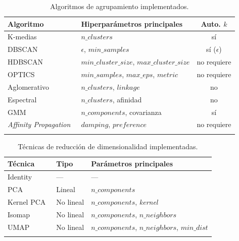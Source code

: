 \begin{longtable}{|l|l|c|} \hline
  \textbf{Algoritmo} & \textbf{Hiperparámetros principales} & \textbf{Auto. $k$} \\ \hline
  K-medias~\cite{arthur_k-means_2007} & $n\_clusters$ & sí \\ \hline
  DBSCAN~\cite{ester_density-based_1996} & $\epsilon$, $min\_samples$ & sí ($\epsilon$) \\ \hline
  HDBSCAN~\cite{campello_density-based_2013} & $min\_cluster\_size$, $max\_cluster\_size$ & no requiere \\ \hline
  OPTICS~\cite{ankerst_optics_1999} & $min\_samples$, $max\_eps$, $metric$ & no requiere \\ \hline
  Aglomerativo~\cite{mullner_modern_2011} & $n\_clusters$, $linkage$ & no \\ \hline
  Espectral~\cite{ng_spectral_2001,huang_ultra-scalable_2020} & $n\_clusters$, afinidad & no \\ \hline
  GMM~\cite{dempster_maximum_1977} & $n\_components$, covarianza & sí \\ \hline
  \textit{Affinity Propagation}~\cite{frey_clustering_2007} & $damping$, $preference$ & no requiere \\ \hline
  \caption{Algoritmos de agrupamiento implementados.}
  \label{tab:clustering-algos}
\end{longtable}

\begin{longtable}{|l|l|l|} \hline
  \textbf{Técnica} & \textbf{Tipo} & \textbf{Parámetros principales} \\ \hline
  Identity & --- & --- \\ \hline
  PCA~\cite{jolliffe_principal_2002} & Lineal & $n\_components$ \\ \hline
  Kernel PCA~\cite{scholkopf_nonlinear_1998} & No lineal & $n\_components$, \textit{kernel} \\ \hline
  Isomap~\cite{tenenbaum_global_2000} & No lineal & $n\_components$, $n\_neighbors$ \\ \hline
  UMAP~\cite{mcinnes_umap_2020} & No lineal & $n\_components$, $n\_neighbors$, $min\_dist$ \\ \hline
  \caption{Técnicas de reducción de dimensionalidad implementadas.}
  \label{tab:reduction}
\end{longtable}

